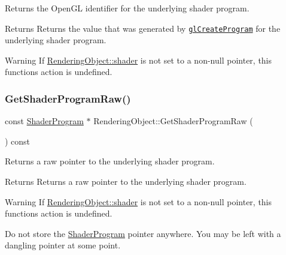 Returns the Open\+GL identifier for the underlying shader program. 

\begin{DoxyReturn}{Returns}
Returns the value that was generated by \href{https://www.opengl.org/sdk/docs/man/html/glCreateProgram.xhtml}{\tt gl\+Create\+Program} for the underlying shader program. 
\end{DoxyReturn}
\begin{DoxyWarning}{Warning}
If \hyperlink{class_rendering_object_ae50e545ce2008ffa802478cd4316e82e}{Rendering\+Object\+::shader} is not set to a non-\/null pointer, this function\textquotesingle{}s action is undefined. 
\end{DoxyWarning}
\hypertarget{class_rendering_object_ab32a982b996ebaca66f4f8b9f4e548b2}{}\label{class_rendering_object_ab32a982b996ebaca66f4f8b9f4e548b2} 
\subsubsection{\texorpdfstring{Get\+Shader\+Program\+Raw()}{GetShaderProgramRaw()}}
{\footnotesize\ttfamily const \hyperlink{class_shader_program}{Shader\+Program} $\ast$ Rendering\+Object\+::\+Get\+Shader\+Program\+Raw (\begin{DoxyParamCaption}{ }\end{DoxyParamCaption}) const}



Returns a raw pointer to the underlying shader program. 

\begin{DoxyReturn}{Returns}
Returns a raw pointer to the underlying shader program. 
\end{DoxyReturn}
\begin{DoxyWarning}{Warning}
If \hyperlink{class_rendering_object_ae50e545ce2008ffa802478cd4316e82e}{Rendering\+Object\+::shader} is not set to a non-\/null pointer, this function\textquotesingle{}s action is undefined. 

Do not store the \hyperlink{class_shader_program}{Shader\+Program} pointer anywhere. You may be left with a dangling pointer at some point. 
\end{DoxyWarning}
\hypertarget{class_rendering_object_af83dd72431c620145b06d2e1bf7a9f3e}{}\label{class_rendering_object_af83dd72431c620145b06d2e1bf7a9f3e} 
